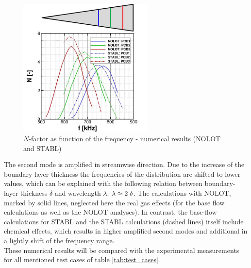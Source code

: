 \documentclass[]{aiaa-tc}%
\begin{document}
\begin{figure}[htbp]
	\centering
\includegraphics[width=0.6\textwidth]{pics/2018_1324_nolot_stabl_n_f.jpg}
	\caption{$N$-factor as function of the frequency - numerical results (NOLOT and STABL)}
	\label{fig:1324_n_f}
\end{figure}

The second mode is amplified in streamwise direction. Due to the increase of the boundary-layer thickness the frequencies of the distribution are shifted to lower values, which can be explained with the following relation between boundary-layer thickness $\delta$ and wavelength $\lambda$\cite{Stetson_1984, Mack_1984}\hspace{0.02cm}: $\lambda \approx 2 \hspace{0.1cm}\delta$. The calculations with NOLOT, marked by solid lines, neglected here the real gas effects (for the base flow calculations as well as the NOLOT analyses). In contrast, the base-flow calculations for STABL and the STABL calculations (dashed lines) itself include chemical effects, which results in higher amplified second modes and additional in a lightly shift of the frequency range.\\

These numerical results will be compared with the experimental measurements for all mentioned test cases of table \ref{tab:test_cases}.
\end{document}
